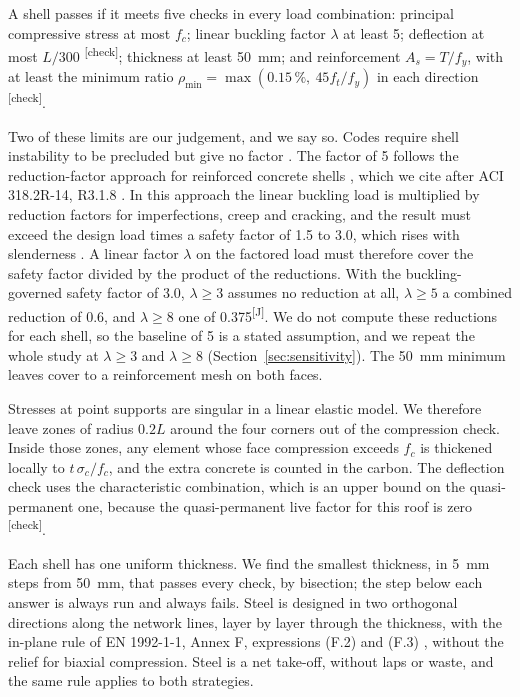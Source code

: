 \documentclass[preprint,12pt]{elsarticle}
\newcommand{\chk}{\textsuperscript{\textcolor{markcol}{\sffamily\scriptsize[check]}}}
\newcommand{\jud}{\textsuperscript{\textcolor{markcol}{\sffamily\scriptsize[J]}}}
\newcommand{\chk}{}
\newcommand{\jud}{}
\begin{document}
A shell passes if it meets five checks in every load combination: principal compressive stress at most $f_c$; linear buckling factor $\lambda$ at least 5; deflection at most $L/300$ \cite[Table~3.4.3]{GB50010}\chk; thickness at least 50~mm; and reinforcement $A_s = T/f_y$, with at least the minimum ratio $\rho_\mathrm{min} = \max(0.15\,\%,\ 45 f_t/f_y)$ in each direction \cite[Table~8.5.1, note~2]{GB50010}\chk.

Two of these limits are our judgement, and we say so. Codes require shell instability to be precluded but give no factor \cite[cl.~3.1.8]{ACI3182}. The factor of 5 follows the reduction-factor approach for reinforced concrete shells \cite{IASS1979}, which we cite after ACI 318.2R-14, R3.1.8 \cite{ACI3182}. In this approach the linear buckling load is multiplied by reduction factors for imperfections, creep and cracking, and the result must exceed the design load times a safety factor of 1.5 to 3.0, which rises with slenderness \cite[p.~318 and Table~3]{Dulacska1995}. A linear factor $\lambda$ on the factored load must therefore cover the safety factor divided by the product of the reductions. With the buckling-governed safety factor of 3.0, $\lambda \geq 3$ assumes no reduction at all, $\lambda \geq 5$ a combined reduction of 0.6, and $\lambda \geq 8$ one of 0.375\jud. We do not compute these reductions for each shell, so the baseline of 5 is a stated assumption, and we repeat the whole study at $\lambda \geq 3$ and $\lambda \geq 8$ (Section~\ref{sec:sensitivity}). The 50~mm minimum leaves cover to a reinforcement mesh on both faces.

Stresses at point supports are singular in a linear elastic model. We therefore leave zones of radius $0.2L$ around the four corners out of the compression check. Inside those zones, any element whose face compression exceeds $f_c$ is thickened locally to $t\,\sigma_c/f_c$, and the extra concrete is counted in the carbon. The deflection check uses the characteristic combination, which is an upper bound on the quasi-permanent one, because the quasi-permanent live factor for this roof is zero \cite[Table~5.3.1]{GB50009}\chk.

Each shell has one uniform thickness. We find the smallest thickness, in 5~mm steps from 50~mm, that passes every check, by bisection; the step below each answer is always run and always fails. Steel is designed in two orthogonal directions along the network lines, layer by layer through the thickness, with the in-plane rule of EN 1992-1-1, Annex F, expressions (F.2) and (F.3) \cite{EN1992}, without the relief for biaxial compression. Steel is a net take-off, without laps or waste, and the same rule applies to both strategies.
\end{document}
